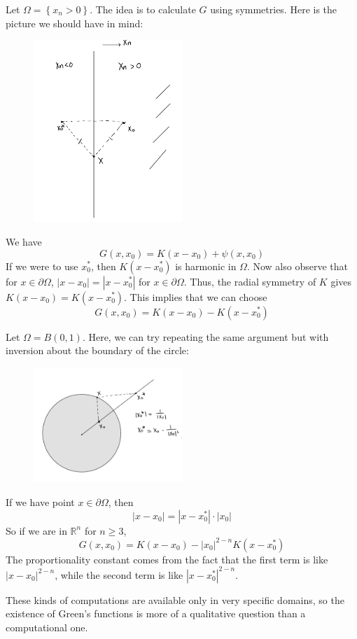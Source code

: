 \begin{example}
     Let $\Omega=\left\{x_{n}>0\right\} .$ The idea is to calculate $G$ using symmetries. Here is the picture we should have in mind:
     \begin{figure}[H]
         \centering
         \includegraphics[width=0.5\textwidth]{Pics/23-3.png}
     \end{figure}
     We have
$$
G\left(x, x_{0}\right)=K\left(x-x_{0}\right)+\psi\left(x, x_{0}\right)
$$
If we were to use $x_{0}^{*}$, then $K\left(x-x_{0}^{*}\right)$ is harmonic in $\Omega$. Now also observe that for $x \in \partial \Omega$, $\left|x-x_{0}\right|=\left|x-x_{0}^{*}\right|$ for $x \in \partial \Omega$. Thus, the radial symmetry of $K$ gives $K\left(x-x_{0}\right)=K\left(x-x_{0}^{*}\right)$. This implies that we can choose
$$
G\left(x, x_{0}\right)=K\left(x-x_{0}\right)-K\left(x-x_{0}^{*}\right)
$$
\end{example}

\begin{example}
Let $\Omega=B(0,1)$. Here, we can try repeating the same argument but with inversion about the boundary of the circle:
\begin{figure}[H]
    \centering
    \includegraphics[width=0.5\textwidth]{Pics/23-4.png}
\end{figure}
If we have point $x \in \partial \Omega$, then
$$
\left|x-x_{0}\right|=\left|x-x_{0}^{*}\right| \cdot\left|x_{0}\right|
$$
So if we are in $\mathbb{R}^{n}$ for $n \geq 3$,
$$
G\left(x, x_{0}\right)=K\left(x-x_{0}\right)-|x_0|^{2-n} K\left(x-x_{0}^{*}\right)
$$
The proportionality constant comes from the fact that the first term is like $\left|x-x_{0}\right|^{2-n}$, while the second term is like $\left|x-x_{0}^{*}\right|^{2-n}$.

These kinds of computations are available only in very specific domains, so the existence of Green's functions is more of a qualitative question than a computational one.
\end{example}